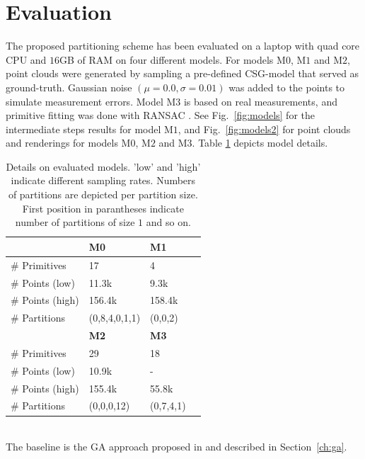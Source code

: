\section{Evaluation}
\label{sec:eval}
The proposed partitioning scheme has been evaluated on a laptop with quad core CPU and $16$GB of RAM on four different models.
For models M$0$, M$1$ and M$2$, point clouds were generated by sampling
a pre-defined \ac{CSG}-model that served as ground-truth. 
Gaussian noise $(\mu=0.0, \sigma=0.01)$ was added to the points to simulate measurement errors.
Model M$3$ is based on real measurements, and primitive fitting was done with RANSAC \cite{schnabel2007efficient}.
See Fig.~\ref{fig:models} for the intermediate steps results for model M$1$, 
and Fig.~\ref{fig:models2} for point clouds and renderings for models M$0$, M$2$ and M$3$.
Table \ref{tab::models} depicts model details.
\begin{table}[h]
	\centering
	\begin{tabular}{|l|l|l|l|}
	\hline
	 & \textbf{M0} & \textbf{M1} \\
	\hline
	\# Primitives & 17 & 4  \\
	\hline
	\# Points (low) & 11.3k & 9.3k\\
	\hline
	\# Points (high) & 156.4k & 158.4k\\
	\hline
	\# Partitions & (0,8,4,0,1,1) & (0,0,2) \\
	\hline
	& \textbf{M2} & \textbf{M3} \\
	\hline
	\# Primitives & 29 & 18  \\
	\hline
	\# Points (low) & 10.9k & - \\
	\hline
	\# Points (high) & 155.4k & 55.8k \\
	\hline
	\# Partitions & (0,0,0,12) & (0,7,4,1) \\	
	\hline	
	\end{tabular}
	\caption{Details on evaluated models. 'low' and 'high' indicate different sampling rates. Numbers of partitions are depicted per partition size. First position in parantheses indicate number of partitions of size $1$ and so on.}
	\label{tab::models}
\end{table}
\\
The baseline is the \ac{GA} approach proposed in \cite{fayolle2016evolutionary} and described in Section~\ref{ch:ga}. 
